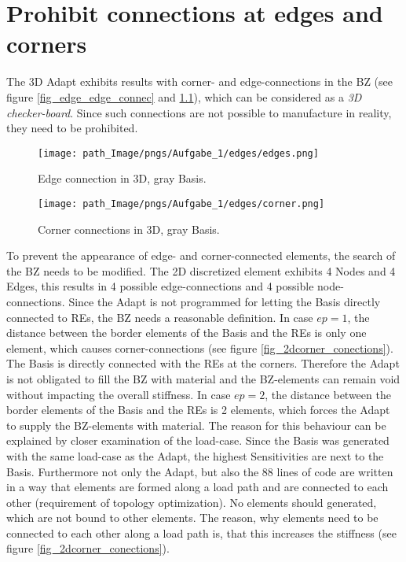 \chapter{Prohibit connections at edges and corners}
\label{chapter_prohibit_edge}

The 3D Adapt exhibits results with corner- and edge-connections in the BZ (see figure \ref{fig_edge_edge_connec}
and \ref{fig_edge_corner_connec}), which
can be considered as a \emph{3D checker-board}.
Since such connections are not possible to manufacture in reality, they need to be prohibited. 

\begin{figure}[!h]
\begin{minipage}{0.45\textwidth}
\centering
 \texttt{[image: path\_Image/pngs/Aufgabe\_1/edges/edges.png]}
	\caption{Edge connection in 3D, gray Basis.} 
	\label{fig_edge_edge_connec}
\end{minipage}
\hfill
\begin{minipage}{0.45\textwidth}
\centering
 \texttt{[image: path\_Image/pngs/Aufgabe\_1/edges/corner.png]}
	\caption{Corner connections in 3D, gray Basis.} 
	\label{fig_edge_corner_connec}
\end{minipage}
\end{figure}
 
 To prevent the appearance of edge- and corner-connected elements,
 the search of the BZ needs to be modified. The 2D discretized
 element exhibits 4 Nodes and 4 Edges, this results in 4 possible 
 edge-connections 
 and 4 possible node-connections. Since the Adapt is 
 not programmed for letting the Basis directly
 connected to REs, the BZ needs a reasonable definition.
 In case $ep = 1$, the distance between the border
 elements of the Basis and the REs is only one element, which causes corner-connections (see figure \ref{fig_2dcorner_conections}).
 The Basis is directly connected with the REs at the corners. Therefore the Adapt is not obligated to fill the BZ with material and
 the BZ-elements can remain void without
 impacting the overall stiffness.
 In case $ep = 2$, the distance between the border elements of the Basis and the REs is 2 elements, which forces the Adapt to supply the BZ-elements with material. 
 The reason for this behaviour can be explained by closer examination of the load-case. Since the Basis was generated with the same load-case as the Adapt, the highest Sensitivities are next to the Basis. Furthermore not only the Adapt, but also the 88 lines of code 
are written in a way that elements are formed along
a load path and are connected to each other (requirement of topology
optimization). No elements
should generated, which are not bound to other elements.
The reason, why elements need to be connected to each other
along a load path is, that this increases the stiffness (see figure \ref{fig_2dcorner_conections}).\\

